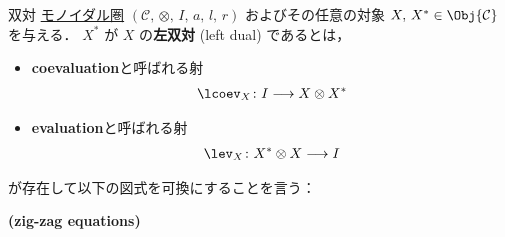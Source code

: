 \documentclass[TQFT_main]{subfiles}
\begin{document}
\begin{mydef}[label=redef:dual,breakable]{双対}
    \hyperref[def:monoidal-category]{モノイダル圏} $(\mathcal{C},\, \otimes,\, I,\, a,\, l,\, r)$ およびその任意の対象 $X,\, X^* \in \Obj{\mathcal{C}}$ を与える．
    $X^*$ が $X$ の\textbf{左双対} (left dual) であるとは，
    \begin{itemize}
        \item \textbf{coevaluation}と呼ばれる射
        \begin{align}
            \lcoev_X \colon I \lto X \otimes X^*
        \end{align}
        \item \textbf{evaluation}と呼ばれる射
        \begin{align}
            \lev_X \colon X^* \otimes X \lto I
        \end{align}
    \end{itemize}
    が存在して以下の図式を可換にすることを言う：
    \begin{description}
        \item[\textbf{(zig-zag equations)}]　
        
        \begin{center}
        \end{center}

        \begin{center}
        \end{center}
    \end{description}
    \tcblower


\end{mydef}
\end{document}
